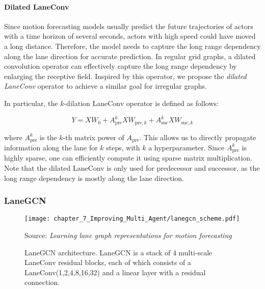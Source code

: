 \paragraph{Dilated LaneConv}
\label{par:7_improving_efficiency_dilated_laneconv}

Since motion forecasting models usually predict the future trajectories of actors with a time horizon of several seconds, actors with high speed could have moved a long distance.
Therefore, the model needs to capture the long range dependency along the lane direction for accurate prediction. In regular grid graphs, a dilated convolution operator \cite{yu2015multi} can effectively capture the long range dependency by enlarging the receptive field. Inspired by this operator, we propose the \textit{dilated LaneConv} operator to achieve a similar goal for irregular graphs. 

In particular, the $k$-dilation LaneConv operator is defined as follows:

\begin{equation}
	Y = XW_0 + A_{\text{pre}}^k X W_{\text{pre},k} + A_{\text{suc}}^k X W_{\text{suc},k}
	\label{eqn:dilated_laneconv}
\end{equation}

where $A_{\text{pre}}^k$ is the $k$-th matrix power of $A_{\text{pre}}$. 
This  allows us to directly propagate information along the lane for $k$ steps, with $k$ a hyperparameter. Since $A_{\text{pre}}^k$ is highly sparse, one can efficiently compute it using sparse matrix multiplication. Note that the dilated LaneConv is only used for predecessor and successor, as the long range dependency is mostly along the lane direction.

\subsubsection{LaneGCN}
\label{subsubsec:4_improving_efficiency_lanegcn}

\begin{figure}[t]                               
	\begin{center}
		\texttt{[image: chapter\_7\_Improving\_Multi\_Agent/lanegcn\_scheme.pdf]}
	\end{center}
	\caption[LaneGCN architecture]{LaneGCN architecture. LaneGCN is a stack of 4 multi-scale LaneConv residual blocks, each of which consists of a LaneConv(1,2,4,8,16,32) and a linear layer with a residual connection.}
	Source: \textit{Learning lane graph representations for motion forecasting} \cite{liang2020learning}
	\label{fig:chapter_7_Improving_Multi_Agent/improving_efficiency_lanegcn}
\end{figure}

